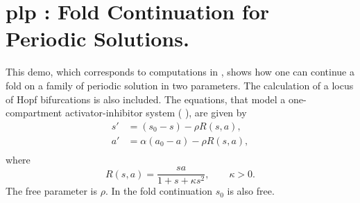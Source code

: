 \documentclass[12pt]{report}
\begin{document}
\section{ plp : Fold Continuation for Periodic Solutions.} \label{sec:Demos_plp}
This demo, which corresponds to computations in 
 \citeyear{DoKeKe:91a}, shows how one can
continue a fold on a family of periodic solution in two parameters.
The calculation of a locus of Hopf bifurcations is also included.
The equations, that model a one-compartment activator-inhibitor system 
( \citeyear{JPK:80}),
are given by
\begin{equation} \begin{array}{cl}
 s' &= (s_{0} - s) - \rho R (s,a), \\
 a' &=\alpha (a_{0} - a) - \rho R (s,a), \\
\end{array} \end{equation}
where
$$ R(s,a)=\frac{s a}{1+s+ \kappa s^{2} },
\qquad \kappa  > 0. $$
The free parameter is $\rho$.
In the fold continuation $s_0$ is also free.
\end{document}
